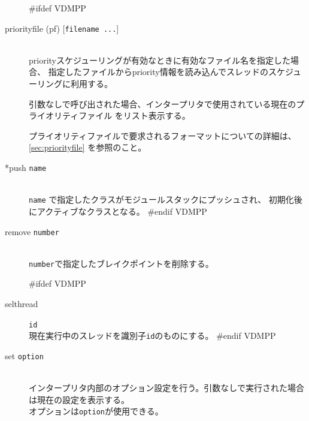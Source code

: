\documentclass[\pformat,12pt]{article}
\begin{document}
\begin{description}
#ifdef VDMPP
\item[priorityfile (pf) \mbox{[{\tt filename ...}]}] \mbox{}\\
  priorityスケジューリングが有効なときに有効なファイル名を指定した場合、
  指定したファイルからpriority情報を読み込んでスレッドのスケジューリングに利用する。
  
  引数なしで呼び出された場合、インタープリタで使用されている現在のプライオリティファイル
  をリスト表示する。

  プライオリティファイルで要求されるフォーマットについての詳細は、\ref{sec:priorityfile} 
  を参照のこと。

\item[*push {\tt name}] \mbox{}\\
  {\tt name} で指定したクラスがモジュールスタックにプッシュされ、
  初期化後にアクティブなクラスとなる。
#endif VDMPP

\item[remove \mbox{\texttt{number}}]
\mbox{}\\
  \texttt{number}で指定したブレイクポイントを削除する。

#ifdef VDMPP
\item[selthread]\texttt{id}\mbox{}\\
  現在実行中のスレッドを識別子\texttt{id}のものにする。 
#endif VDMPP

\item[set {\tt option} \ifthenelse{\boolean{VDMsl}}{\mbox{[{\tt argument}]}}{}]\mbox{}\\
  インタープリタ内部のオプション設定を行う。引数なしで実行された場合は現在の設定を表示する。\\
  オプションは{\tt option}\/が使用できる。
  

\end{description}
\end{document}
